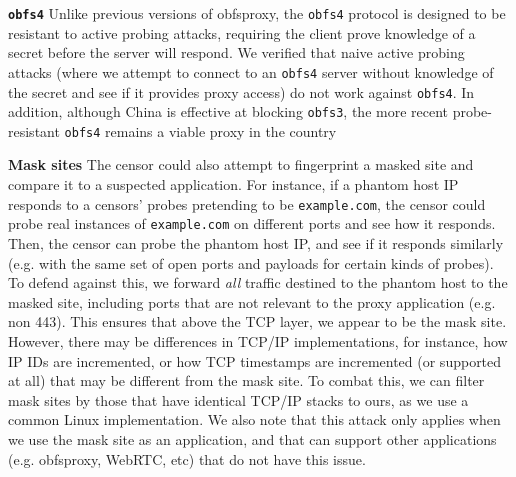 \documentclass[sigconf]{acmart}
\renewcommand{\paragraph}[1]{\smallskip\noindent\textbf{#1\quad}}
\begin{document}

\paragraph{\texttt{obfs4}}
Unlike previous versions of obfsproxy, the \texttt{obfs4} protocol is designed to
be resistant to active probing
attacks, requiring the client prove knowledge of a secret before the server will
respond. We verified that naive active probing attacks (where we attempt to
connect to an \texttt{obfs4} server without knowledge of the secret and see if
it provides proxy access) do not work
against \texttt{obfs4}. In addition, although China is effective at blocking
\texttt{obfs3}, the more recent probe-resistant \texttt{obfs4} remains a viable
proxy in the country


\paragraph{Mask sites}
The censor could also attempt to fingerprint a masked site and compare it to a
suspected \scheme application. For instance, if a phantom host IP responds to a
censors' probes
pretending to be \texttt{example.com}, the censor could probe real instances
of \texttt{example.com} on different ports and see how it responds. Then, the
censor can probe the phantom host IP, and see if it responds similarly (e.g. with
the same set of open ports and payloads for certain kinds of probes). To defend
against this, we forward \emph{all} traffic destined to the phantom host to the
masked site, including ports that are not relevant to the proxy application
(e.g. non 443). This ensures that above the TCP layer, we appear to be the mask
site. However, there may be differences in TCP/IP implementations, for instance,
how IP IDs are incremented, or how TCP timestamps are incremented (or supported
at all) that may be different from the mask site. To combat this, we can filter
mask sites by those that have identical TCP/IP stacks to ours, as we use a
common Linux implementation. We also note that this attack only applies when we
use the mask site as an application, and that \scheme can support other
applications (e.g. obfsproxy, WebRTC, etc) that do not have this issue.
\end{document}
